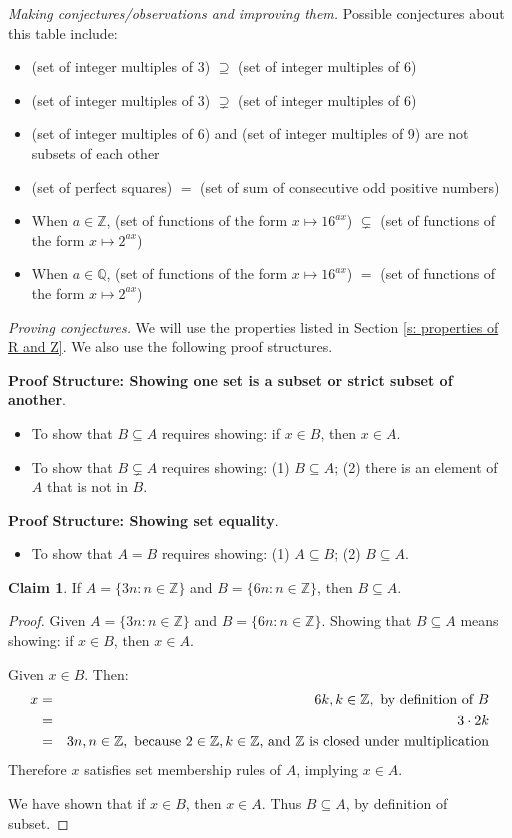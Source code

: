 \documentclass[11pt]{article}
\newcommand\tn{\textnormal}
\newcommand{\Q}{\mathbb{Q}}
\newcommand{\Z}{\mathbb{Z}}
\renewcommand\subset\subseteq
\renewcommand\supset\supseteq  %
\newcommand\st{:}
\theoremstyle{definition}
\newtheorem*{claim*}{Claim}
\begin{document}
{\it Making conjectures/observations and improving them.}  Possible conjectures about this table include:

	\begin{itemize}
	\item (set of integer multiples of 3) $\supset$ (set of integer multiples of 6)
	\item (set of integer multiples of 3) $\supsetneq$ (set of integer multiples of 6)
	\item (set of integer multiples of 6) and (set of integer multiples of 9) are not subsets of each other
	\item (set of perfect squares) $=$ (set of sum of consecutive odd positive numbers)
	\item  When $a\in \Z$, (set of functions of the form $x\mapsto 16^{ax}$) $\subsetneq$ (set of functions of the form $x\mapsto 2^{ax}$)
	\item  When $a \in \Q$, (set of functions of the	form $x\mapsto 16^{ax}$) $=$ (set of functions of the form $x\mapsto 2^{ax}$)
	\end{itemize}

{\it Proving conjectures.}  
We will use the properties listed in Section \ref{s: properties of R and Z}. We also use the following proof structures.

{\bf Proof Structure: Showing one set is a subset or strict subset of another}.
	\begin{itemize}
	\item To show that $B\subset A$ requires showing: if $x\in B$, then $x\in A$.
	\item To show that $B\subsetneq A$ requires showing: (1) $B\subset A$; (2) there is an element of $A$ that is not in $B$.
	\end{itemize}

{\bf Proof Structure: Showing set equality}. 
	\begin{itemize}
	\item To show that $A=B$ requires showing: (1) $A\subset B$; (2) $B\subset A$.
	\end{itemize}
		
\begin{claim*}
If $A=\{ 3n \st n \in \Z\}$ and $B=\{ 6n \st n\in \Z\}$, then $B\subset A$.
\end{claim*}
\begin{proof}
Given $A=\{ 3n \st n \in \Z\}$ and $B=\{ 6n \st  n\in \Z\}$. Showing that $B\subset A$ means showing: if $x\in B$, then $x\in A$.

Given $x\in B$. Then:
	\begin{eqnarray*}
	x &=&6k, k\in \Z, \tn{ by definition of $B$} \\ 
	   &=& 3\cdot 2k \\ 
	   &=& 3n, n\in \Z, \tn{ because $2\in \Z, k\in \Z$, and $\Z$ is closed under multiplication}
	\end{eqnarray*}
Therefore $x$ satisfies set membership rules of $A$, implying $x\in A$. 

We have shown that if $x\in B$, then $x\in A$. Thus $B\subset A$, by definition of subset.
\end{proof}
\end{document}
